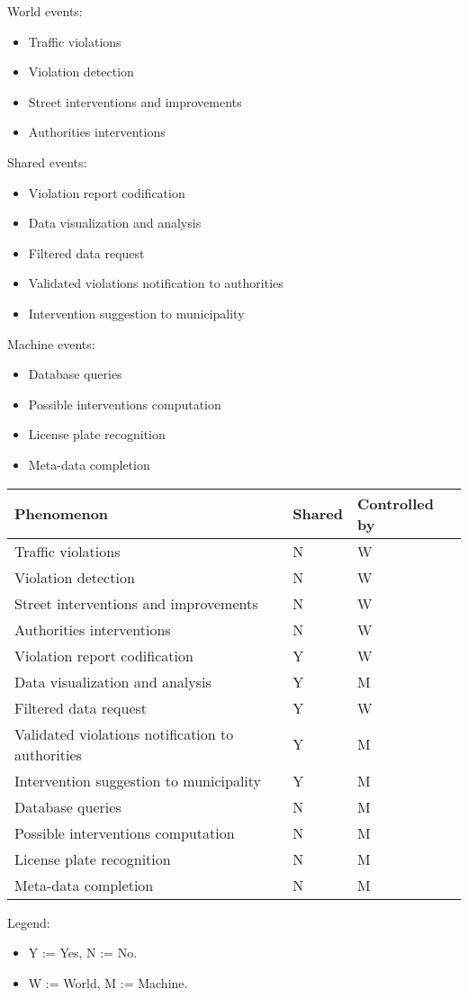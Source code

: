 World events:
\begin{itemize}
    \item Traffic violations
    \item Violation detection
    \item Street interventions and improvements
    \item Authorities interventions
\end{itemize}

Shared events:
\begin{itemize}
    \item Violation report codification
    \item Data visualization and analysis
    \item Filtered data request
    \item Validated violations notification to authorities
    \item Intervention suggestion to municipality
\end{itemize}

Machine events:
\begin{itemize}
    \item Database queries
    \item Possible interventions computation
    \item License plate recognition
    \item Meta-data completion
\end{itemize}

\bigskip
\begin{center}
\begin{tabular}{|p{9cm}|l|l|}
	\hline 
	Phenomenon & Shared & Controlled by\\ 
	\hline 
	Traffic violations &  N & W \\ 
	\hline 
	Violation detection &  N & W\\ 
	\hline 
	Street interventions and improvements & N &  W \\ 
	\hline 
	Authorities interventions & N &  W \\
	\hline 
	Violation report codification & Y & W\\ 
	\hline 
	Data visualization and analysis & Y & M\\ 
	\hline
	Filtered data request & Y & W\\
	\hline 
	Validated violations notification to authorities & Y & M\\ 
	\hline 
	Intervention suggestion to municipality & Y & M\\ 
	\hline 
	Database queries & N & M\\ 
	\hline
	Possible interventions computation & N & M\\ 
	\hline
	License plate recognition & N & M\\ 
	\hline
	Meta-data completion & N & M\\ 
	\hline
\end{tabular} 
\end{center}
Legend:
\begin{itemize}
	\item Y := Yes, N := No.
	\item W := World, M := Machine.
\end{itemize}



